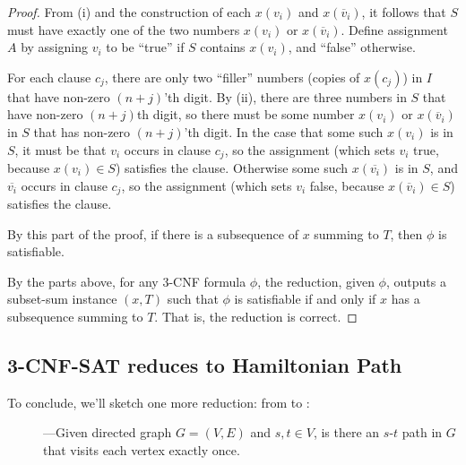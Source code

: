 \documentclass[11pt]{article}
\begin{document}
\begin{proof}
  From (i) and the construction of each $x(v_i)$ and $x(\overline v_i)$,
  it follows that $S$ must have exactly one of the two numbers
  $x(v_i)$ or $x(\overline v_i)$.
  Define assignment $A$ by assigning $v_i$ to be ``true''
  if $S$ contains $x(v_i)$, and ``false'' otherwise.
  
  For each clause $c_j$,
  there are only two ``filler'' numbers  (copies of $x(c_j)$) in $I$ 
  that have non-zero $(n+j)$'th digit.
  By (ii), there are three numbers in $S$ that have non-zero $(n+j)$th digit,
  so there must be some number $x(v_i)$ or $x(\overline v_i)$
  in $S$ that has non-zero $(n+j)$'th digit.
  In the case that some such $x(v_i)$ is in $S$,
  it must be that $v_i$ occurs in clause $c_j$,
  so the assignment (which sets $v_i$ true, because $x(v_i)\in S$)
  satisfies the clause.
  Otherwise some such $x(\overline{v_i})$ is in $S$,
  and $\overline{v_i}$ occurs in clause $c_j$,
  so the assignment (which sets $v_i$ false, because $x(\overline v_i)\in S$)
  satisfies the clause.

  By this part of the proof,
  if there is a subsequence of $x$ summing to $T$,
  then $\phi$ is satisfiable.

  \smallskip

  By the parts above,
  for any 3-CNF formula $\phi$, 
  the reduction, given $\phi$,
  outputs a subset-sum instance $(x,T)$
  such that $\phi$ is satisfiable if and only if $x$ has a subsequence summing to $T$.
  That is, the reduction is correct.
\end{proof}

\subsection{3-CNF-SAT reduces to Hamiltonian Path}

To conclude, we'll sketch one more reduction:
from  to  :

\begin{description}
\item[]---Given directed graph $G=(V,E)$ and $s,t\in V$,
  is there an $s$-$t$ path in $G$ that visits each vertex exactly once.
\end{description}
\end{document}

